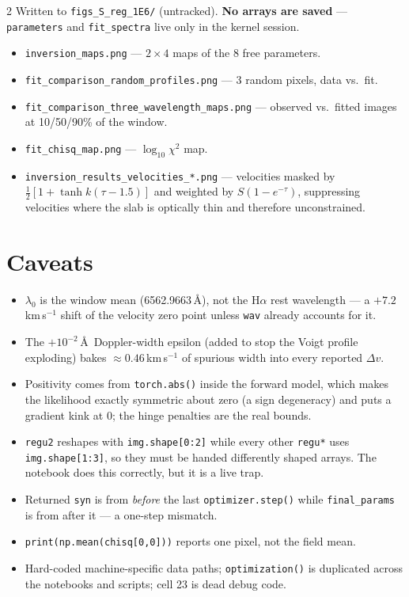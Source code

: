 \documentclass[9pt,a4paper]{article}
\newcommand{\co}[1]{{\small\texttt{#1}}}
\begin{document}
\begin{multicols}{2}
Written to \co{figs\_S\_reg\_1E6/} (untracked). \textbf{No arrays are saved} --- \co{parameters} and \co{fit\_spectra} live only in the kernel session.

\begin{itemize}
\item \co{inversion\_maps.png} --- $2\times4$ maps of the 8 free parameters.
\item \co{fit\_comparison\_random\_profiles.png} --- 3 random pixels, data vs.\ fit.
\item \co{fit\_comparison\_three\_wavelength\_maps.png} --- observed vs.\ fitted images at 10/50/90\% of the window.
\item \co{fit\_chisq\_map.png} --- $\log_{10}\chi^2$ map.
\item \co{inversion\_results\_velocities\_*.png} --- velocities masked by $\tfrac12[1+\tanh k(\tau-1.5)]$ and weighted by $S(1-e^{-\tau})$, suppressing velocities where the slab is optically thin and therefore unconstrained.
\end{itemize}

\section{Caveats}

\begin{itemize}
\item $\lambda_0$ is the window mean (6562.9663\,\AA), not the H$\alpha$ rest wavelength --- a $+7.2$\,km\,s$^{-1}$ shift of the velocity zero point unless \co{wav} already accounts for it.
\item The $+10^{-2}$\,\AA\ Doppler-width epsilon (added to stop the Voigt profile exploding) bakes ${\approx}0.46$\,km\,s$^{-1}$ of spurious width into every reported $\Delta v$.
\item Positivity comes from \co{torch.abs()} inside the forward model, which makes the likelihood exactly symmetric about zero (a sign degeneracy) and puts a gradient kink at 0; the hinge penalties are the real bounds.
\item \co{regu2} reshapes with \co{img.shape[0:2]} while every other \co{regu*} uses \co{img.shape[1:3]}, so they must be handed differently shaped arrays. The notebook does this correctly, but it is a live trap.
\item Returned \co{syn} is from \emph{before} the last \co{optimizer.step()} while \co{final\_params} is from after it --- a one-step mismatch.
\item \co{print(np.mean(chisq[0,0]))} reports one pixel, not the field mean.
\item Hard-coded machine-specific data paths; \co{optimization()} is duplicated across the notebooks and scripts; cell 23 is dead debug code.
\end{itemize}

\end{multicols}
\end{document}
